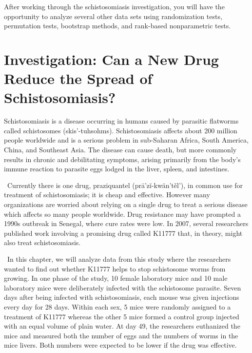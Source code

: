 \documentclass[
]{report}
\theoremstyle{definition}
\theoremstyle{definition}
\theoremstyle{definition}
\theoremstyle{definition}
\theoremstyle{remark}
\begin{document}
After working through the schistosomiasis investigation, you will have the opportunity to
analyze several other data sets using randomization tests, permutation tests, bootstrap methods,
and rank-based nonparametric tests.

\hypertarget{investigation-can-a-new-drug-reduce-the-spread-of-schistosomiasis}{%
\section{\texorpdfstring{\textbf{Investigation: Can a New Drug Reduce the Spread of Schistosomiasis?}}{Investigation: Can a New Drug Reduce the Spread of Schistosomiasis?}}\label{investigation-can-a-new-drug-reduce-the-spread-of-schistosomiasis}}

Schistosomiasis is a disease occurring in humans caused by parasitic flatworms called schistosomes (skis'-tuhsohms).
Schistosomiasis affects about 200 million people worldwide and is a serious problem in sub-Saharan
Africa, South America, China, and Southeast Asia. The disease can cause death, but more commonly results
in chronic and debilitating symptoms, arising primarily from the body's immune reaction to parasite eggs
lodged in the liver, spleen, and intestines.

~Currently there is one drug, praziquantel (prā'zĭ-kwän'těl'), in common use for treatment of schistosomiasis; it is cheap and effective. However many organizations are worried about relying on a single drug to treat a serious disease which affects so many people worldwide. Drug resistance may have prompted a 1990s outbreak in Senegal, where cure rates were low. In 2007, several researchers published work involving a promising drug called K11777 that, in theory, might also treat schistosomiasis.

~In this chapter, we will analyze data from this study where the researchers wanted to find out whether K11777 helps to stop schistosome worms from growing. In one phase of the study, 10 female laboratory mice and 10 male laboratory mice were deliberately infected with the schistosome parasite. Seven days after being infected with schistosomiasis, each mouse was given injections every day for 28 days. Within each sex, 5 mice were randomly assigned to a treatment of K11777 whereas the other 5 mice formed a control group injected with an equal volume of plain water. At day 49, the researchers euthanized the mice and measured both the number of eggs and the numbers of worms in the mice livers. Both numbers were expected to be lower if the drug was effective.
\end{document}
